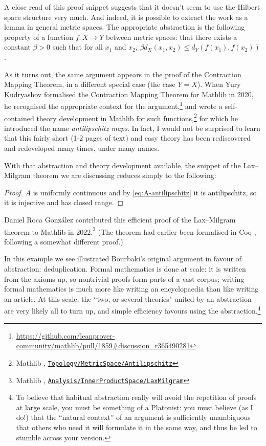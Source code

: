 \documentclass[12pt]{llncs}
\begin{document}
A close read of this proof snippet
suggests that it doesn't seem to use the Hilbert space structure very much.
And indeed, it is possible to extract the work as a lemma in general metric spaces.
The appropriate abstraction is the following property of a function $f:X\to Y$ between metric spaces:
that there exists a constant $\beta>0$ such that for all $x_1$ and $x_2$,
$\beta d_X(x_1,x_2)\le d_Y(f(x_1),f(x_2))$.

As it turns out,
the same argument appears in the proof of the Contraction Mapping Theorem,
in a different special case (the case $Y = X$).
When Yury Kudryashov formalised the Contraction Mapping Theorem for Mathlib in 2020,
he recognised the appropriate context for the argument,\footnote{
  \url{https://github.com/leanprover-community/mathlib/pull/1859\#discussion\_r365490281}}
and wrote a self-contained theory development in Mathlib for such functions,\footnote{
  Mathlib \cite{Mathlib}, \href{https://github.com/leanprover-community/mathlib4/blob/21b3a48ba0f69a4ae9eb44dbacbc4de43a6290bf/Mathlib/Topology/MetricSpace/Antilipschitz.lean}{\texttt{Topology/MetricSpace/Antilipschitz}}}
for which he introduced the name \emph{antilipschitz maps}.
In fact, I would not be surprised to learn that this fairly short (1-2 pages of text) and easy theory
has been rediscovered and redeveloped many times, under many names.

With that abstraction and theory development available,
the snippet of the Lax--Milgram theorem we are discussing reduces simply to the following:

\begin{proof}
  $A$ is uniformly continuous and by \cref{eq:A-antilipschitz} it is antilipschitz, so it is injective and has closed range.
\end{proof}

Daniel Roca Gonz\'alez contributed this efficient proof of the Lax--Milgram theorem to Mathlib in 2022.\footnote{
  Mathlib \cite{Mathlib}, \href{https://github.com/leanprover-community/mathlib4/blob/21b3a48ba0f69a4ae9eb44dbacbc4de43a6290bf/Mathlib/Analysis/InnerProductSpace/LaxMilgram.lean}{\texttt{Analysis/InnerProductSpace/LaxMilgram}}}
(The theorem had earlier been formalised in Coq \cite{BCFMM17}, following a somewhat different proof.)

In this example we see illustrated Bourbaki's original argument in favour of abstraction: deduplication.
Formal mathematics is done at scale:
 it 
is written from the axioms up,
so nontrivial proofs form parts of a vast corpus;
writing formal mathematics is much more like writing an encyclopaedia than like writing an article.
At this scale,
the ``two, or several theories" united by an abstraction
are very likely all to turn up,
and simple efficiency favours using the abstraction.\footnote{
To believe that habitual abstraction really will avoid the repetition of proofs at large scale,
you must be something of a Platonist:
you must believe (as I do!) that the ``natural context'' of an argument is sufficiently unambiguous
that others who need it will formulate it in the same way,
and thus be led to stumble across your version.
}
\end{document}
